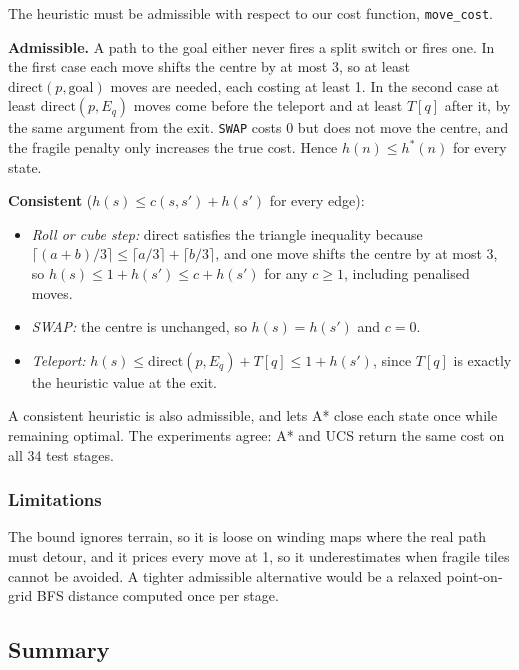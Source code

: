 The heuristic must be admissible with respect to our cost function, \texttt{move\_cost}.

\textbf{Admissible.} A path to the goal either never fires a split switch or fires one. In the
first case each move shifts the centre by at most 3, so at least $\mathrm{direct}(p,\text{goal})$
moves are needed, each costing at least 1. In the second case at least
$\mathrm{direct}(p, E_q)$ moves come before the teleport and at least $T[q]$ after it, by the same
argument from the exit. \texttt{SWAP} costs 0 but does not move the centre, and the fragile penalty
only increases the true cost. Hence $h(n) \le h^*(n)$ for every state.

\textbf{Consistent} ($h(s) \le c(s,s') + h(s')$ for every edge):
\begin{itemize}[leftmargin=*]
\item \emph{Roll or cube step:} $\mathrm{direct}$ satisfies the triangle inequality because
$\lceil (a+b)/3 \rceil \le \lceil a/3 \rceil + \lceil b/3 \rceil$, and one move shifts the centre by
at most 3, so $h(s) \le 1 + h(s') \le c + h(s')$ for any $c \ge 1$, including penalised moves.
\item \emph{SWAP:} the centre is unchanged, so $h(s) = h(s')$ and $c = 0$.
\item \emph{Teleport:} $h(s) \le \mathrm{direct}(p, E_q) + T[q] \le 1 + h(s')$, since $T[q]$ is
exactly the heuristic value at the exit.
\end{itemize}
A consistent heuristic is also admissible, and lets A* close each state once while remaining
optimal. The experiments agree: A* and UCS return the same cost on all 34 test stages.

\subsubsection{Limitations}

The bound ignores terrain, so it is loose on winding maps where the real path must detour, and it
prices every move at 1, so it underestimates when fragile tiles cannot be avoided. A tighter
admissible alternative would be a relaxed point-on-grid BFS distance computed once per stage.

\subsection{Summary}

